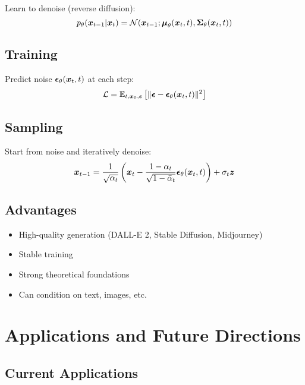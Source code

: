 Learn to denoise (reverse diffusion):
\begin{equation}
p_{\theta}(\boldsymbol{x}_{t-1}|\boldsymbol{x}_t) = \mathcal{N}(\boldsymbol{x}_{t-1}; \boldsymbol{\mu}_{\theta}(\boldsymbol{x}_t, t), \boldsymbol{\Sigma}_{\theta}(\boldsymbol{x}_t, t))
\end{equation}

\subsection{Training}

Predict noise $\boldsymbol{\epsilon}_{\theta}(\boldsymbol{x}_t, t)$ at each step:
\begin{equation}
\mathcal{L} = \mathbb{E}_{t, \boldsymbol{x}_0, \boldsymbol{\epsilon}}\left[\|\boldsymbol{\epsilon} - \boldsymbol{\epsilon}_{\theta}(\boldsymbol{x}_t, t)\|^2\right]
\end{equation}

\subsection{Sampling}

Start from noise and iteratively denoise:
\begin{equation}
\boldsymbol{x}_{t-1} = \frac{1}{\sqrt{\alpha_t}}\left(\boldsymbol{x}_t - \frac{1-\alpha_t}{\sqrt{1-\bar{\alpha}_t}}\boldsymbol{\epsilon}_{\theta}(\boldsymbol{x}_t, t)\right) + \sigma_t \boldsymbol{z}
\end{equation}

\subsection{Advantages}

\begin{itemize}
    \item High-quality generation (DALL-E 2, Stable Diffusion, Midjourney)
    \item Stable training
    \item Strong theoretical foundations
    \item Can condition on text, images, etc.
\end{itemize}

\section{Applications and Future Directions}
\label{sec:generative-applications}

\subsection{Current Applications}

